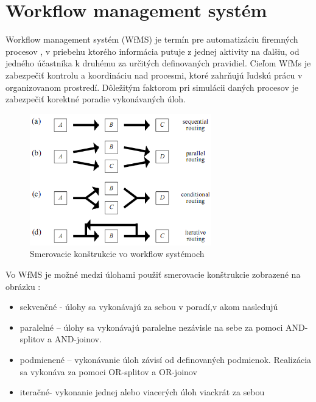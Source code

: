 

\section{Workflow management systém}

Workflow management systém (WfMS) je termín pre automatizáciu firemných procesov , v priebehu ktorého informácia putuje z jednej aktivity na ďalšiu, od jedného účastníka k druhému za určitých definovaných pravidiel. Cieľom WfMs je zabezpečiť kontrolu a koordináciu nad procesmi, ktoré zahrňujú ľudskú prácu v organizovanom prostredí.
Dôležitým faktorom pri simulácii daných procesov je zabezpečiť korektné poradie vykonávaných úloh.


\begin{figure}[h]
	\centerline{\includegraphics[width=0.7\textwidth]{images/smerovacie_konstrukcie}}
	\caption[smerovacie konštrukcie]{Smerovacie konštrukcie vo workflow systémoch}
	\label{obr:cursus}
\end{figure}


Vo WfMS je možné medzi úlohami použiť smerovacie konštrukcie zobrazené na obrázku :
\begin{itemize}
	\item sekvenčné - úlohy sa vykonávajú za sebou v poradí,v akom nasledujú
	\item paralelné – úlohy sa vykonávajú paralelne nezávisle na sebe za pomoci AND-splitov a AND-joinov.
	\item podmienené – vykonávanie úloh závisí od definovaných podmienok. Realizácia sa vykonáva za pomoci OR-splitov a OR-joinov
	\item iteračné- vykonanie jednej alebo viacerých úloh viackrát za sebou
\end{itemize}


